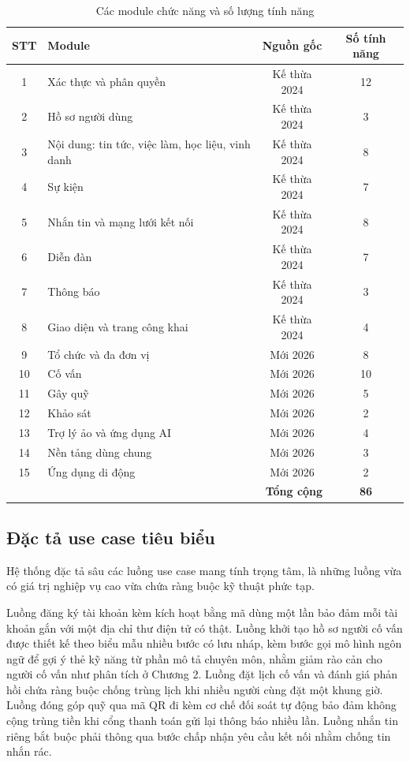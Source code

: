 \documentclass[12pt,a4paper,oneside]{report}
\begin{document}
\renewcommand{\arraystretch}{1.25}
\begin{table}[H]
\centering
\small
\caption{Các module chức năng và số lượng tính năng}
\label{tab:modules}
\begin{tabular}{|c|>{\raggedright\arraybackslash}p{7.6cm}|c|c|}
\hline
\textbf{STT} & \textbf{Module} & \textbf{Nguồn gốc} & \textbf{Số tính năng} \\ \hline
1 & Xác thực và phân quyền & Kế thừa 2024 & 12 \\ \hline
2 & Hồ sơ người dùng & Kế thừa 2024 & 3 \\ \hline
3 & Nội dung: tin tức, việc làm, học liệu, vinh danh & Kế thừa 2024 & 8 \\ \hline
4 & Sự kiện & Kế thừa 2024 & 7 \\ \hline
5 & Nhắn tin và mạng lưới kết nối & Kế thừa 2024 & 8 \\ \hline
6 & Diễn đàn & Kế thừa 2024 & 7 \\ \hline
7 & Thông báo & Kế thừa 2024 & 3 \\ \hline
8 & Giao diện và trang công khai & Kế thừa 2024 & 4 \\ \hline
9 & Tổ chức và đa đơn vị & Mới 2026 & 8 \\ \hline
10 & Cố vấn & Mới 2026 & 10 \\ \hline
11 & Gây quỹ & Mới 2026 & 5 \\ \hline
12 & Khảo sát & Mới 2026 & 2 \\ \hline
13 & Trợ lý ảo và ứng dụng AI & Mới 2026 & 4 \\ \hline
14 & Nền tảng dùng chung & Mới 2026 & 3 \\ \hline
15 & Ứng dụng di động & Mới 2026 & 2 \\ \hline
\multicolumn{3}{|r|}{\textbf{Tổng cộng}} & \textbf{86} \\ \hline
\end{tabular}
\end{table}
\renewcommand{\arraystretch}{1}

\subsection{Đặc tả use case tiêu biểu}

Hệ thống đặc tả sâu các luồng use case mang tính trọng tâm, là những luồng vừa có giá trị nghiệp vụ cao vừa chứa ràng buộc kỹ thuật phức tạp.

Luồng đăng ký tài khoản kèm kích hoạt bằng mã dùng một lần bảo đảm mỗi tài khoản gắn với một địa chỉ thư điện tử có thật. Luồng khởi tạo hồ sơ người cố vấn được thiết kế theo biểu mẫu nhiều bước có lưu nháp, kèm bước gọi mô hình ngôn ngữ để gợi ý thẻ kỹ năng từ phần mô tả chuyên môn, nhằm giảm rào cản cho người cố vấn như phân tích ở Chương 2. Luồng đặt lịch cố vấn và đánh giá phản hồi chứa ràng buộc chống trùng lịch khi nhiều người cùng đặt một khung giờ. Luồng đóng góp quỹ qua mã QR đi kèm cơ chế đối soát tự động bảo đảm không cộng trùng tiền khi cổng thanh toán gửi lại thông báo nhiều lần. Luồng nhắn tin riêng bắt buộc phải thông qua bước chấp nhận yêu cầu kết nối nhằm chống tin nhắn rác.
\end{document}
